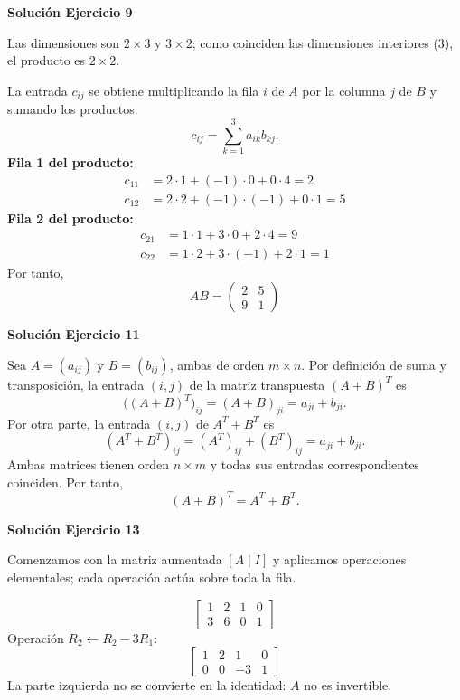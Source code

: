 \par\bigskip\noindent\textbf{Solución Ejercicio 9}\par\nobreak
Las dimensiones son $2\times3$ y $3\times2$; como coinciden las dimensiones interiores (3), el producto es $2\times2$.

La entrada $c_{ij}$ se obtiene multiplicando la fila $i$ de $A$ por la columna $j$ de $B$ y sumando los productos:
\[
c_{ij}=\sum_{k=1}^{3} a_{ik}b_{kj}.
\]
\textbf{Fila 1 del producto:}
\[
\begin{aligned}c_{11}&=2\cdot 1+(-1)\cdot 0+0\cdot 4=2\\c_{12}&=2\cdot 2+(-1)\cdot (-1)+0\cdot 1=5\end{aligned}
\]
\textbf{Fila 2 del producto:}
\[
\begin{aligned}c_{21}&=1\cdot 1+3\cdot 0+2\cdot 4=9\\c_{22}&=1\cdot 2+3\cdot (-1)+2\cdot 1=1\end{aligned}
\]
Por tanto,
\[
\boxed{AB=\begin{pmatrix}2&5\\9&1\end{pmatrix}}
\]

\par\bigskip\noindent\textbf{Solución Ejercicio 11}\par\nobreak
Sea $A=(a_{ij})$ y $B=(b_{ij})$, ambas de orden $m\times n$. Por definición de suma y transposición, la entrada $(i,j)$ de la matriz transpuesta $(A+B)^T$ es
\[
\bigl((A+B)^T\bigr)_{ij}=(A+B)_{ji}=a_{ji}+b_{ji}.
\]
Por otra parte, la entrada $(i,j)$ de $A^T+B^T$ es
\[
(A^T+B^T)_{ij}=(A^T)_{ij}+(B^T)_{ij}=a_{ji}+b_{ji}.
\]
Ambas matrices tienen orden $n\times m$ y todas sus entradas correspondientes coinciden. Por tanto,
\[
\boxed{(A+B)^T=A^T+B^T}.
\]

\par\bigskip\noindent\textbf{Solución Ejercicio 13}\par\nobreak
Comenzamos con la matriz aumentada $[A\mid I]$ y aplicamos operaciones elementales; cada operación actúa sobre toda la fila.

\[
\left[\begin{array}{rr|rr}1&2&1&0\\3&6&0&1\end{array}\right]
\]
Operación $R_{2}\leftarrow R_{2}-3R_{1}$:
\[
\left[\begin{array}{rr|rr}1&2&1&0\\0&0&-3&1\end{array}\right]
\]
La parte izquierda no se convierte en la identidad: $A$ no es invertible.

